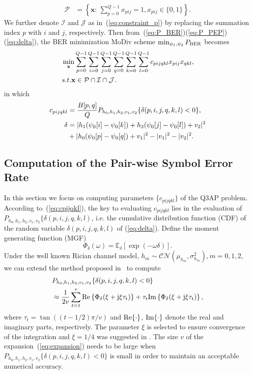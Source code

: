 \documentclass[journal]{IEEEtran}
\newcommand{\BER}{\rm{BER}}
\renewcommand{\Re}{\rm Re}
\renewcommand{\Im}{\rm Im}
\begin{document}
\begin{align}
    \mathcal{P} & = \left\{\mathbf{x}:\,\sum_{p=0}^{Q-1}x_{pij} = 1,
    x_{pij}\in\{0, 1\}\right\}. \label{eq:constraint_p}
\end{align}
We further denote $\mathcal{I}$ and $\mathcal{J}$ as in~(\ref{eq:constraint_p})
by replacing the summation index $p$ with $i$ and $j$, respectively. Then
from~(\ref{eq:P_BER})(\ref{eq:P_PEP})(\ref{eq:delta}), the BER minimization
MoDiv scheme $\min_{\psi_1, \psi_2}P_{\BER}$ becomes
\begin{align}
    & \min_{\mathbf{x}}\sum_{p=0}^{Q-1}\sum_{i=0}^{Q-1}\sum_{j=0}^{Q-1}
    \sum_{q=0}^{Q-1}\sum_{k=0}^{Q-1}\sum_{l=0}^{Q-1}c_{pijqkl}x_{pij}x_{qkl},
    \label{eq:Q3AP}\\
    & \mbox{s.t. } \mathbf{x}\in \mathcal{P}\cap\mathcal{I}\cap\mathcal{J}.
    \notag
\end{align}
in which
\begin{align}
    c_{pijqkl} & = \frac{B[p, q]}{Q}P_{h_0,h_1,h_2,v_1,v_2}\{\delta(p,i,j,q,k,l)
    < 0\},
    \label{eq:cpijqkl} \\
    \delta & = |h_1(\psi_0[i] - \psi_0[k])+h_2(\psi_0[j] - \psi_0[l])+v_2|^2 
 \notag
    \\
    & + |h_0(\psi_0[p] - \psi_0[q]) + v_1|^2 - |v_1|^2 -
    |v_2|^2.\label{eq:delta_pijqkl}
\end{align}

\subsection{Computation of the Pair-wise Symbol Error Rate}

In this section we focus on computing parameters $\{c_{pijqkl}\}$ of the Q3AP
problem. According to~(\ref{eq:cpijqkl}), the key to evaluating $c_{pijqkl}$
lies in the evaluation of $P_{h_0,h_1,h_2,v_1,v_2}\{\delta(p,i,j,q,k,l)$, i.e.
the cumulative distribution function (CDF) of the random variable
$\delta(p,i,j,q,k,l)$ of (\ref{eq:delta}). Define the moment generating function
(MGF)
\[
    \Phi_{\delta}(\omega) = \mathbb{E}_{\delta}[\exp(-\omega\delta)].
\]
Under the well known Rician channel model, 
$h_m\sim\mathcal{CN}(\mu_{h_m},\sigma_{h_m}^2), m=0,1,2$, we can extend the
method proposed in~\cite{harvind2005symbol, taricco2002exact} to compute
\begin{align}
    & P_{h_0,h_1,h_2,v_1,v_2}\{\delta(p,i,j,q,k,l) < 0\} \notag \\
    & \approx \frac{1}{2v}\sum_{t=1}^v \Re\left\{\Phi_{\delta}(\xi +
    j\xi\tau_t)\right\} + \tau_t\Im\left\{\Phi_{\delta}(\xi +
    j\xi\tau_t)\right\},
    \label{eq:expansion}
\end{align}
where $\tau_t = \tan((t- 1/2)\pi/v)$ and $\Re\{\cdot\}$, $\Im\{\cdot\}$ denote
the real and imaginary parts, respectively. The parameter $\xi$ is selected to
ensure convergence of the integration and $\xi = 1/4$ was suggested in
\cite{taricco2002exact}. The size $v$ of the expansion~(\ref{eq:expansion})
needs to be large when $ P_{h_0,h_1,h_2,v_1,v_2}\{\delta(p,i,j,q,k,l) < 0\}$ is
small in order to maintain an acceptable numerical accuracy.
\end{document}
